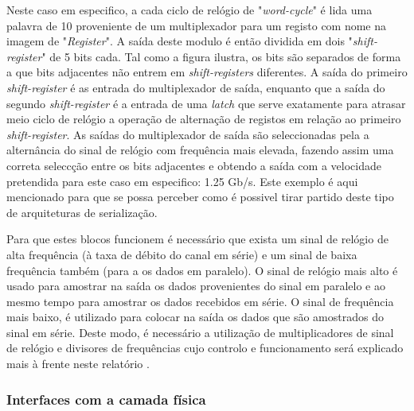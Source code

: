 Neste caso em especifico, a cada ciclo de relógio de "\textit{word-cycle}" é lida uma palavra de 10 proveniente de um multiplexador para um registo com nome na imagem de "\textit{Register}". A saída deste modulo é então dividida em dois "\textit{shift-register}"  de 5 bits cada. Tal como a figura ilustra, os bits são separados de forma a que bits adjacentes não entrem em \textit{shift-registers} diferentes. A saída do primeiro \textit{shift-register} é as entrada do multiplexador de saída, enquanto que a saída do segundo \textit{shift-register} é a entrada de uma \textit{latch} que serve exatamente para atrasar meio ciclo de relógio a operação de alternação de registos em relação ao primeiro \textit{shift-register}. As saídas do multiplexador de saída são seleccionadas pela a alternância do sinal de relógio com frequência mais elevada, fazendo assim uma correta seleccção entre os bits adjacentes e obtendo a saída com a velocidade pretendida para este caso em especifico: 1.25 Gb/s. Este exemplo é aqui mencionado para que se possa perceber como é possivel tirar partido deste tipo de arquiteturas de serialização.
%


Para que estes blocos funcionem é necessário que exista um sinal de relógio de alta frequência (à taxa de débito do canal em série) e um sinal de baixa frequência também (para a os dados em paralelo). O sinal de relógio mais alto é usado para amostrar na saída os dados provenientes do sinal em paralelo e ao mesmo tempo para amostrar os dados recebidos em série. O sinal de frequência mais baixo, é utilizado para colocar na saída os dados que são amostrados do sinal em série. Deste modo, é necessário a utilização de multiplicadores de sinal de relógio e divisores de frequências cujo controlo e funcionamento será explicado mais à frente neste relatório .


\subsubsection*{Interfaces com a camada física} \label{subsub:pre_enfase_equalizacao}

